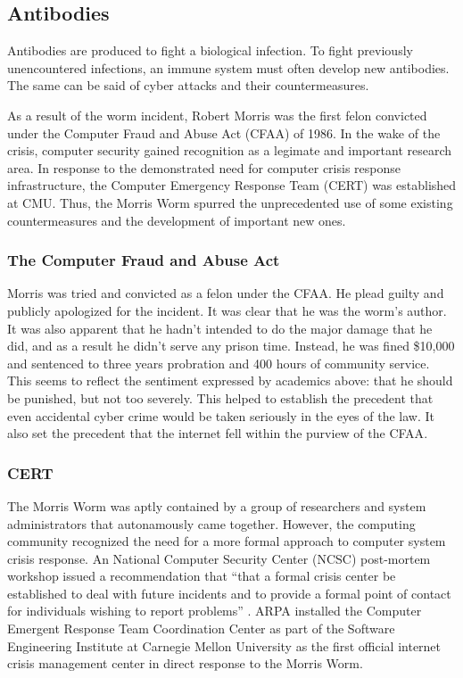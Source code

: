 \subsection*{Antibodies}
Antibodies are produced to fight a biological infection. To fight previously
unencountered infections, an immune system must often develop new antibodies.
The same can be said of cyber attacks and their countermeasures. 

As a result of the worm incident, Robert Morris was the first felon convicted
under the Computer Fraud and Abuse Act (CFAA) of 1986. In the wake of the
crisis, computer security gained recognition as a legimate and important
research area. In response to the demonstrated need for computer crisis
response infrastructure, the Computer Emergency Response Team (CERT) was
established at CMU. Thus, the Morris Worm spurred the unprecedented use of some
existing countermeasures and the development of important new ones.

\subsubsection*{The Computer Fraud and Abuse Act}
Morris was tried and convicted as a felon under the CFAA. He plead guilty and
publicly apologized for the incident. It was clear that he was the worm's
author. It was also apparent that he hadn't intended to do the major damage that
he did, and as a result he didn't serve any prison time. Instead, he was
fined \$10,000 and sentenced to three years probration and 400 hours of
community service\cite{lee_washpost_2013}. This seems to reflect the sentiment
expressed by academics above: that he should be punished, but not too severely.
This helped to establish the precedent that even accidental cyber crime would be
taken seriously in the eyes of the law. It also set the precedent that the
internet fell within the purview of the CFAA\cite{adams_controlling_1996}. 

\subsubsection*{CERT}
The Morris Worm was aptly contained by a group of researchers and
system administrators that autonamously came together. However, the
computing community recognized the need for a more formal approach to computer
system crisis response. An National Computer Security Center (NCSC) post-mortem
workshop issued a recommendation that ``that a formal crisis center be
established to deal with future incidents and to provide a formal point of
contact for individuals wishing to report problems'' \cite{spafford_crisis_1989}.
ARPA installed the Computer Emergent Response Team Coordination Center
as part of the Software Engineering Institute at Carnegie Mellon University as
the first official internet crisis management center in direct response to the
Morris Worm\cite{fithen_cert_1994}.

